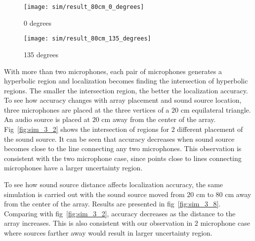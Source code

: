 \begin{figure*}[]
  \centering
  \begin{subfigure}[]{.48\textwidth}
    \texttt{[image: sim/result\_80cm\_0\_degrees]}
    \caption{0 degrees}
  \end{subfigure}
  \begin{subfigure}[]{.48\textwidth}
    \texttt{[image: sim/result\_80cm\_135\_degrees]}
    \caption{135 degrees}
  \end{subfigure}
  \caption{Uncertainty region. Microphones are at the vertices of a $20$cm equilateral triangle. The source is $80$cm away from the array.}
  \label{fig:sim_3_8}
\end{figure*}

With more than two microphones, each pair of microphones generates a hyperbolic region and localization becomes finding the intersection of hyperbolic regions. The smaller the intersection region, the better the localization accuracy. To see how accuracy changes with array placement and sound source location, three microphones are placed at the three vertices of a $20$ cm equilateral triangle. An audio source is placed at $20$ cm away from the center of the array. Fig~\ref{fig:sim_3_2} shows the intersection of regions for $2$ different placement of the sound source. It can be seen that accuracy decreases when sound source becomes close to the line connecting any two microphones. This observation is consistent with the two microphone case, since points close to lines connecting microphones have a larger uncertainty region.

To see how sound source distance affects localization accuracy, the same simulation is carried out with the sound source moved from $20$ cm to $80$ cm away from the center of the array. Results are presented in fig~\ref{fig:sim_3_8}. Comparing with fig~\ref{fig:sim_3_2}, accuracy decreases as the distance to the array increases. This is also consistent with our observation in $2$ microphone case where sources farther away would result in larger uncertainty region.

